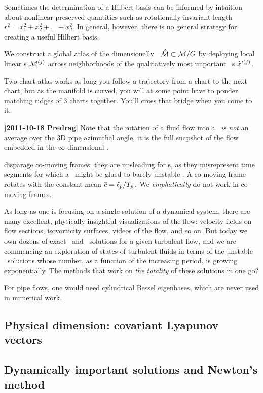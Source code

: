 Sometimes the determination of a Hilbert basis can be informed by
intuition about nonlinear preserved quantities such as rotationally
invariant length $r^2 = x_1^2 + x_2^2 + ... + x_d^2$. In general,
however, there is no general strategy for creating a useful Hilbert
basis.

We construct a global atlas of the dimensionally \reducedsp\ $\hat{\cal M}
\subset {\cal M}/G$ by deploying local linear \slice s  ${\cal M}{}^{(j)}$
across neighborhoods of the qualitatively most important \template\
{\cohStr s} ${\hat{x}'}{}^{(j)}$.

Two-chart atlas works as long you follow a trajectory from a chart to the
next chart, but as the manifold is curved, you will at some point have to
ponder matching ridges of 3 charts together. You'll cross that bridge
when you come to it.

{\bf [2011-10-18 Predrag]}
Note that the rotation of a fluid flow into a \slice\ {\em is not}
an average over the 3D pipe azimuthal angle, it is the full snapshot of
the flow embedded in the $\infty$-dimensional \statesp.

disparage co-moving frames: they are misleading for \rpo s, as they
    misrepresent time segments for which a \po\ might be glued to
    barely unstable \eqv. A co-moving frame rotates with the constant
    mean
    $\overline{c}= \ell_p/{T_{p}}
    \,.
    $ We \emph{emphatically} do not work in
    co-moving frames.

As long as one is focusing on a single solution of a dynamical system, there are many
    excellent, physically insightful visualizations of the flow:
    velocity fields on flow sections, isovorticity surfaces, videos of the
    flow, and so on. But today we own dozens of exact \eqv\ and \reqv\
    solutions for a given turbulent flow, and we are commencing an exploration of
    states of turbulent fluids in terms of the unstable \po\ solutions whose
    number, as a function of the increasing period, is growing exponentially.
The methods that work on  \emph{the totality} of these solutions in one go?

For pipe flows, one would need cylindrical Bessel eigenbases, which are
never used in numerical work.

\subsection{Physical dimension: covariant Lyapunov vectors}

\subsection{Dynamically important solutions and Newton's method}
\label{s:reqva}

